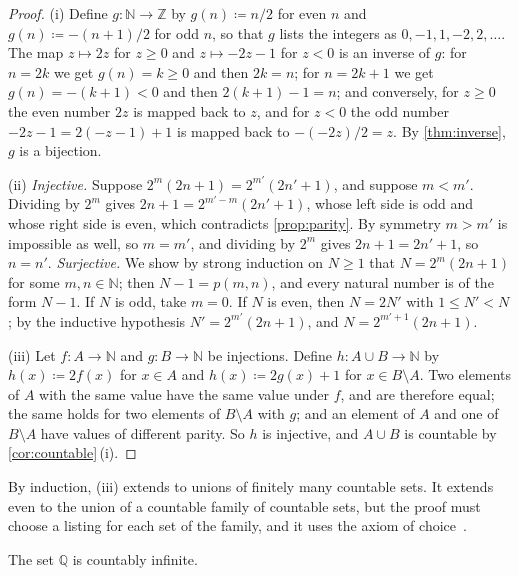 \begin{proof}
(i) Define $g\colon\mathbb N\to\mathbb Z$ by $g(n)\coloneqq n/2$ for even $n$ and $g(n)\coloneqq-(n+1)/2$ for odd $n$, so that $g$ lists the integers as $0,-1,1,-2,2,\ldots$. The map $z\mapsto2z$ for $z\ge0$ and $z\mapsto-2z-1$ for $z<0$ is an inverse of $g$: for $n=2k$ we get $g(n)=k\ge0$ and then $2k=n$; for $n=2k+1$ we get $g(n)=-(k+1)<0$ and then $2(k+1)-1=n$; and conversely, for $z\ge0$ the even number $2z$ is mapped back to $z$, and for $z<0$ the odd number $-2z-1=2(-z-1)+1$ is mapped back to $-(-2z)/2=z$. By \cref{thm:inverse}, $g$ is a bijection.

(ii) \emph{Injective.} Suppose $2^m(2n+1)=2^{m'}(2n'+1)$, and suppose $m<m'$. Dividing by $2^m$ gives $2n+1=2^{m'-m}(2n'+1)$, whose left side is odd and whose right side is even, which contradicts \cref{prop:parity}. By symmetry $m>m'$ is impossible as well, so $m=m'$, and dividing by $2^m$ gives $2n+1=2n'+1$, so $n=n'$. \emph{Surjective.} We show by strong induction on $N\ge1$ that $N=2^m(2n+1)$ for some $m,n\in\mathbb N$; then $N-1=p(m,n)$, and every natural number is of the form $N-1$. If $N$ is odd, take $m=0$. If $N$ is even, then $N=2N'$ with $1\le N'<N$; by the inductive hypothesis $N'=2^{m'}(2n+1)$, and $N=2^{m'+1}(2n+1)$.

(iii) Let $f\colon A\to\mathbb N$ and $g\colon B\to\mathbb N$ be injections. Define $h\colon A\cup B\to\mathbb N$ by $h(x)\coloneqq2f(x)$ for $x\in A$ and $h(x)\coloneqq2g(x)+1$ for $x\in B\setminus A$. Two elements of $A$ with the same value have the same value under $f$, and are therefore equal; the same holds for two elements of $B\setminus A$ with $g$; and an element of $A$ and one of $B\setminus A$ have values of different parity. So $h$ is injective, and $A\cup B$ is countable by \cref{cor:countable}\,(i).
\end{proof}

By induction, (iii) extends to unions of finitely many countable sets. It extends even to the union of a countable family of countable sets, but the proof must choose a listing for each set of the family, and it uses the axiom of choice~\cite{jech2003}.

\begin{theorem}
\label{thm:q-countable}
The set $\mathbb Q$ is countably infinite.
\end{theorem}


